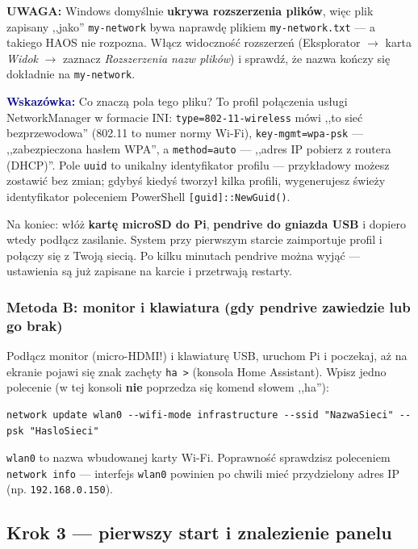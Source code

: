 \documentclass[11pt,a4paper]{article}
\newcommand{\uwaga}[1]{\par\medskip\noindent\textcolor{warnred}{\textbf{UWAGA:}} #1\par\medskip}
\newcommand{\wskazowka}[1]{\par\medskip\noindent\textcolor{navy}{\textbf{Wskazówka:}} #1\par\medskip}
\begin{document}
\uwaga{Windows domyślnie \textbf{ukrywa rozszerzenia plików}, więc plik zapisany ,,jako'' \texttt{my-network} bywa naprawdę plikiem \texttt{my-network.txt} --- a takiego HAOS nie rozpozna. Włącz widoczność rozszerzeń (Eksplorator $\to$ karta \emph{Widok} $\to$ zaznacz \emph{Rozszerzenia nazw plików}) i sprawdź, że nazwa kończy się dokładnie na \texttt{my-network}.}

\wskazowka{Co znaczą pola tego pliku? To profil połączenia usługi NetworkManager w formacie INI: \texttt{type=802-11-wireless} mówi ,,to sieć bezprzewodowa'' (802.11 to numer normy Wi-Fi), \texttt{key-mgmt=wpa-psk} --- ,,zabezpieczona hasłem WPA'', a \texttt{method=auto} --- ,,adres IP pobierz z routera (DHCP)''. Pole \texttt{uuid} to unikalny identyfikator profilu --- przykładowy możesz zostawić bez zmian; gdybyś kiedyś tworzył kilka profili, wygenerujesz świeży identyfikator poleceniem PowerShell \texttt{[guid]::NewGuid()}.}

Na koniec: włóż \textbf{kartę microSD do Pi}, \textbf{pendrive do gniazda USB} i dopiero wtedy podłącz zasilanie. System przy pierwszym starcie zaimportuje profil i połączy się z Twoją siecią. Po kilku minutach pendrive można wyjąć --- ustawienia są już zapisane na karcie i przetrwają restarty.

\subsubsection{Metoda B: monitor i klawiatura (gdy pendrive zawiedzie lub go brak)}

Podłącz monitor (micro-HDMI!) i klawiaturę USB, uruchom Pi i poczekaj, aż na ekranie pojawi się znak zachęty \texttt{ha >} (konsola Home Assistant). Wpisz jedno polecenie (w tej konsoli \textbf{nie} poprzedza się komend słowem ,,ha''):

\begin{lstlisting}
network update wlan0 --wifi-mode infrastructure --ssid "NazwaSieci" --psk "HasloSieci"
\end{lstlisting}

\texttt{wlan0} to nazwa wbudowanej karty Wi-Fi. Poprawność sprawdzisz poleceniem \texttt{network info} --- interfejs \texttt{wlan0} powinien po chwili mieć przydzielony adres IP (np. \texttt{192.168.0.150}).

\subsection{Krok 3 --- pierwszy start i znalezienie panelu}
\end{document}
